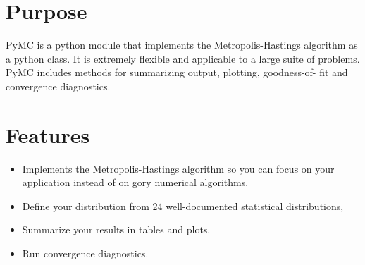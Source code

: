 





\hypertarget{purpose}{}
\section*{Purpose}
\label{purpose}

PyMC is a python module that implements the Metropolis-Hastings algorithm as a
python class. It is extremely flexible and applicable to a large suite of
problems. PyMC includes methods for summarizing output, plotting, goodness-of-
fit and convergence diagnostics.



\hypertarget{features}{}
\section*{Features}
\label{features}
\begin{itemize}
\item {} 
Implements the Metropolis-Hastings algorithm so you can focus on your
application instead of on gory numerical algorithms.

\item {} 
Define your distribution from 24 well-documented statistical distributions,

\item {} 
Summarize your results in tables and plots.

\item {} 
Run convergence diagnostics.

\end{itemize}



\hypertarget{what-s-new-in-2-0}{}
